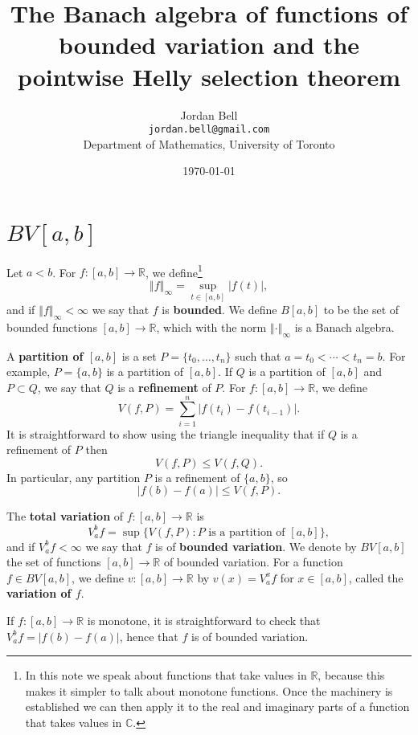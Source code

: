 \documentclass{article}
\newcommand{\norm}[1]{\left\Vert #1 \right\Vert}
\theoremstyle{definition}
\begin{document}
\title{The Banach algebra of functions of bounded variation and the pointwise Helly selection theorem}
\author{Jordan Bell\\ \texttt{jordan.bell@gmail.com}\\Department of Mathematics, University of Toronto}
\date{\today}

\maketitle

\section{$BV[a,b]$}
Let $a<b$. For $f:[a,b] \to \mathbb{R}$, we define\footnote{In this note we speak about functions that take values in $\mathbb{R}$, because
this makes it simpler to talk about monotone functions. Once the machinery is established we can
then apply it to the real and imaginary parts of a function that takes values in $\mathbb{C}$.}
\[
\norm{f}_\infty = \sup_{t \in [a,b]} |f(t)|,
\]
and if $\norm{f}_\infty<\infty$ we say that $f$ is \textbf{bounded}. We define
$B[a,b]$ to be the set of bounded functions $[a,b] \to \mathbb{R}$, which with the norm $\norm{\cdot}_\infty$ is a Banach algebra.



A \textbf{partition of $[a,b]$} is a set
$P=\{t_0,\ldots,t_n\}$ such that $a=t_0<\cdots<t_n=b$. For example, $P=\{a,b\}$ is a partition of $[a,b]$.
If $Q$ is a partition of $[a,b]$ and $P \subset Q$, we say that $Q$ is a \textbf{refinement} of $P$.
For $f:[a,b] \to \mathbb{R}$,
 we define
\[
V(f,P) = \sum_{i=1}^n |f(t_i)-f(t_{i-1})|.
\]
It is straightforward to show using the triangle inequality that if $Q$ is a refinement of $P$ then
\[
V(f,P) \leq V(f,Q).
\]
In particular, any partition $P$ is a refinement of $\{a,b\}$, so
\[
|f(b)-f(a)| \leq V(f,P).
\]


The \textbf{total variation} of $f:[a,b] \to \mathbb{R}$ is 
\[
V_a^b f = \sup \{V(f,P): \textrm{$P$ is a partition of $[a,b]$}\},
\]
and if $V_a^b f <\infty$ we say that $f$ is of \textbf{bounded variation}. We denote by $BV[a,b]$ the set of functions $[a,b] \to \mathbb{R}$ of bounded
variation. 
For a function $f \in BV[a,b]$, we define 
$v:[a,b] \to \mathbb{R}$ by $v(x)=V_a^x f$ for $x \in [a,b]$, called
the \textbf{variation of $f$}.

If $f:[a,b] \to \mathbb{R}$ is monotone, it is straightforward to check that
$V_a^b f =|f(b)-f(a)|$,
 hence that $f$
is of bounded variation.
\end{document}
